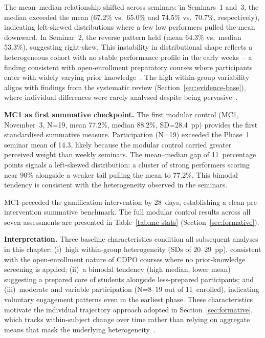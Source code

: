 The mean--median relationship shifted across seminars: in Seminars~1 and~3, the median exceeded the mean (67.2\% vs.\ 65.0\% and 74.5\% vs.\ 70.7\%, respectively), indicating left-skewed distributions where a few low performers pulled the mean downward. In Seminar~2, the reverse pattern held (mean 64.3\% vs.\ median 53.3\%), suggesting right-skew. This instability in distributional shape reflects a heterogeneous cohort with no stable performance profile in the early weeks~-- a finding consistent with open-enrollment preparatory courses where participants enter with widely varying prior knowledge~\cite{CohenManionMorrison2018}. The high within-group variability aligns with findings from the systematic review (Section~\ref{sec:evidence-base}), where individual differences were rarely analysed despite being pervasive~\cite{Korniienko2025mrqs}.

\textbf{MC1 as first summative checkpoint.} The first modular control (MC1, November~3, N=19, mean 77.2\%, median 88.2\%, SD=28.4~pp) provides the first standardised summative measure. Participation (N=19) exceeded the Phase~1 seminar mean of 14.3, likely because the modular control carried greater perceived weight than weekly seminars. The mean--median gap of 11~percentage points signals a left-skewed distribution: a cluster of strong performers scoring near 90\% alongside a weaker tail pulling the mean to 77.2\%. This bimodal tendency is consistent with the heterogeneity observed in the seminars.

MC1 preceded the gamification intervention by 28~days, establishing a clean pre-intervention summative benchmark. The full modular control results across all seven assessments are presented in Table~\ref{tab:mc-stats} (Section~\ref{sec:formative}).

\textbf{Interpretation.} Three baseline characteristics condition all subsequent analyses in this chapter: (i)~high within-group heterogeneity (SDs of 20--29~pp), consistent with the open-enrollment nature of CDPO courses where no prior-knowledge screening is applied; (ii)~a bimodal tendency (high median, lower mean) suggesting a prepared core of students alongside less-prepared participants; and (iii)~moderate and variable participation (N=8--19 out of 11~enrolled), indicating voluntary engagement patterns even in the earliest phase. These characteristics motivate the individual trajectory approach adopted in Section~\ref{sec:formative}, which tracks within-subject change over time rather than relying on aggregate means that mask the underlying heterogeneity~\cite{ary, CohenManionMorrison2018}.

